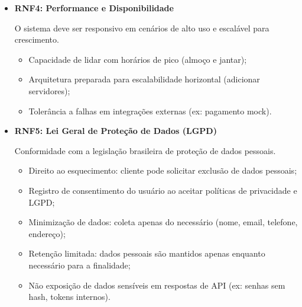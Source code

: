 \begin{itemize}
  \item \textbf{RNF4: Performance e Disponibilidade}

  O sistema deve ser responsivo em cenários de alto uso e escalável para crescimento.

  \begin{itemize}[topsep=0pt, itemsep=0pt]
    \item Capacidade de lidar com horários de pico (almoço e jantar);
    \item Arquitetura preparada para escalabilidade horizontal (adicionar servidores);
    \item Tolerância a falhas em integrações externas (ex: pagamento mock).
  \end{itemize}
\end{itemize}

\begin{itemize}
  \item \textbf{RNF5: Lei Geral de Proteção de Dados (LGPD)}

  Conformidade com a legislação brasileira de proteção de dados pessoais.

  \begin{itemize}[topsep=0pt, itemsep=0pt]
    \item Direito ao esquecimento: cliente pode solicitar exclusão de dados pessoais;
    \item Registro de consentimento do usuário ao aceitar políticas de privacidade e LGPD;
    \item Minimização de dados: coleta apenas do necessário (nome, email, telefone, endereço);
    \item Retenção limitada: dados pessoais são mantidos apenas enquanto necessário para a finalidade;
    \item Não exposição de dados sensíveis em respostas de API (ex: senhas sem hash, tokens internos).
  \end{itemize}
\end{itemize}

\newpage
